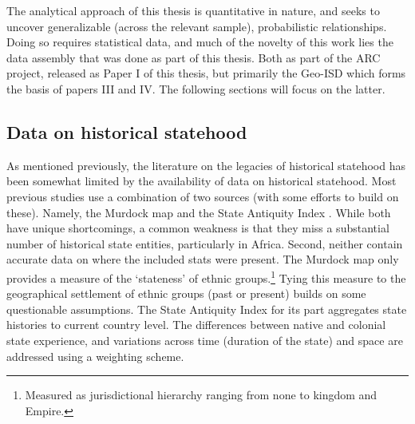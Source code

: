 
The analytical approach of this thesis is quantitative in nature, and seeks to
uncover generalizable (across the relevant sample), probabilistic relationships.
Doing so requires statistical data, and much of the novelty of this work lies
the data assembly that was done as part of this thesis. Both as part of the ARC
project, released as Paper I of this thesis, but primarily the Geo-ISD which
forms the basis of papers III and IV. The following sections will focus on the
latter.

\subsection{Data on historical statehood} \label{Data on historical statehood}






As mentioned previously, the literature on the legacies of historical statehood
has been somewhat limited by the availability of data on historical statehood.
Most previous studies use a combination of two sources (with some efforts to
build on these). Namely, the Murdock map \citep{Murdock1967} and the State
Antiquity Index \citep{Bockstette2012}. While both have unique shortcomings, a
common weakness is that they miss a substantial number of historical state
entities, particularly in Africa. Second, neither contain accurate data on where
the included stats were present. The Murdock map \citep{Murdock1967} only
provides a measure of the `stateness' of ethnic groups.\footnote{Measured as
jurisdictional hierarchy ranging from none to kingdom and Empire.} Tying this
measure to the geographical settlement of ethnic groups (past or present) builds
on some questionable assumptions. The State Antiquity Index for its part
aggregates state histories to current country level. The differences between
native and colonial state experience, and variations across time (duration of
the state) and space are addressed using a weighting scheme.

